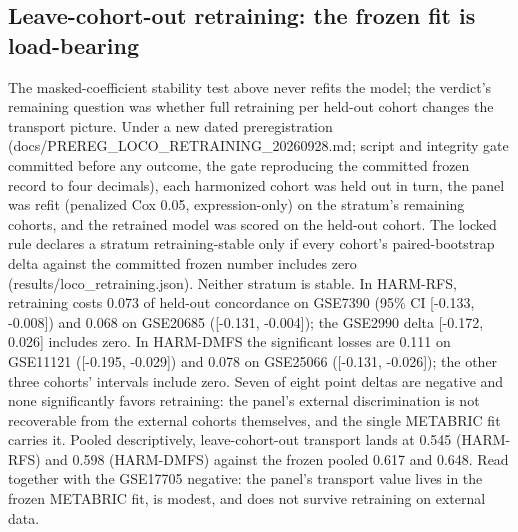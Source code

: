 \documentclass[12pt,a4paper]{article}
\begin{document}
\subsection{Leave-cohort-out retraining: the frozen fit is load-bearing}
The masked-coefficient stability test above never refits the model; the
verdict's remaining question was whether full retraining per held-out cohort
changes the transport picture. Under a new dated preregistration
(docs/PREREG\_LOCO\_RETRAINING\_20260928.md; script and integrity gate
committed before any outcome, the gate reproducing the committed frozen
record to four decimals), each harmonized cohort was held out in turn, the
panel was refit (penalized Cox 0.05, expression-only) on the stratum's
remaining cohorts, and the retrained model was scored on the held-out cohort.
The locked rule declares a stratum retraining-stable only if every cohort's
paired-bootstrap delta against the committed frozen number includes zero
(results/loco\_retraining.json). Neither stratum is stable. In HARM-RFS,
retraining costs 0.073 of held-out concordance on GSE7390 (95\% CI
[-0.133, -0.008]) and 0.068 on GSE20685 ([-0.131, -0.004]); the GSE2990 delta
[-0.172, 0.026] includes zero. In HARM-DMFS the significant losses are 0.111
on GSE11121 ([-0.195, -0.029]) and 0.078 on GSE25066 ([-0.131, -0.026]); the
other three cohorts' intervals include zero. Seven of eight point deltas are
negative and none significantly favors retraining: the panel's external
discrimination is not recoverable from the external cohorts themselves, and
the single METABRIC fit carries it. Pooled descriptively, leave-cohort-out
transport lands at 0.545 (HARM-RFS) and 0.598 (HARM-DMFS) against the frozen
pooled 0.617 and 0.648. Read together with the GSE17705 negative: the panel's
transport value lives in the frozen METABRIC fit, is modest, and does not
survive retraining on external data.
\end{document}
